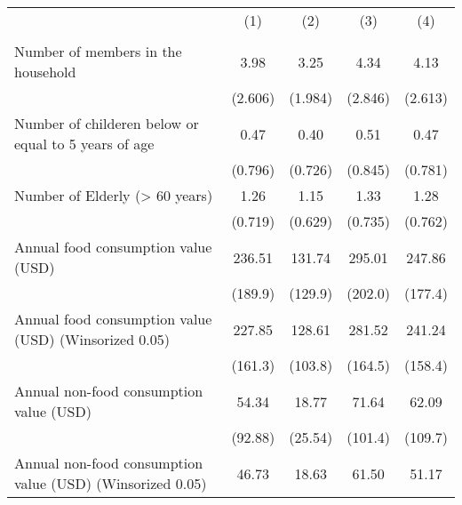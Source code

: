 {
\def\sym#1{\ifmmode^{#1}\else\(^{#1}\)\fi}
\begin{tabular}{l*{4}{c}}
\hline\hline
                    &\multicolumn{1}{c}{(1)}&\multicolumn{1}{c}{(2)}&\multicolumn{1}{c}{(3)}&\multicolumn{1}{c}{(4)}\\
                    &\multicolumn{1}{c}{} &\multicolumn{1}{c}{} &\multicolumn{1}{c}{} &\multicolumn{1}{c}{} \\
\hline
Number of members in the household&        3.98         &        3.25         &        4.34         &        4.13         \\
                    &     (2.606)         &     (1.984)         &     (2.846)         &     (2.613)         \\
[1em]
Number of childeren below or equal to 5 years of age&        0.47         &        0.40         &        0.51         &        0.47         \\
                    &     (0.796)         &     (0.726)         &     (0.845)         &     (0.781)         \\
[1em]
Number of Elderly (> 60 years)&        1.26         &        1.15         &        1.33         &        1.28         \\
                    &     (0.719)         &     (0.629)         &     (0.735)         &     (0.762)         \\
[1em]
Annual food consumption value (USD)&      236.51         &      131.74         &      295.01         &      247.86         \\
                    &     (189.9)         &     (129.9)         &     (202.0)         &     (177.4)         \\
[1em]
Annual food consumption value (USD) (Winsorized 0.05)&      227.85         &      128.61         &      281.52         &      241.24         \\
                    &     (161.3)         &     (103.8)         &     (164.5)         &     (158.4)         \\
[1em]
Annual non-food consumption value (USD)&       54.34         &       18.77         &       71.64         &       62.09         \\
                    &     (92.88)         &     (25.54)         &     (101.4)         &     (109.7)         \\
[1em]
Annual non-food consumption value (USD) (Winsorized 0.05)&       46.73         &       18.63         &       61.50         &       51.17         \\

\end{tabular}}
